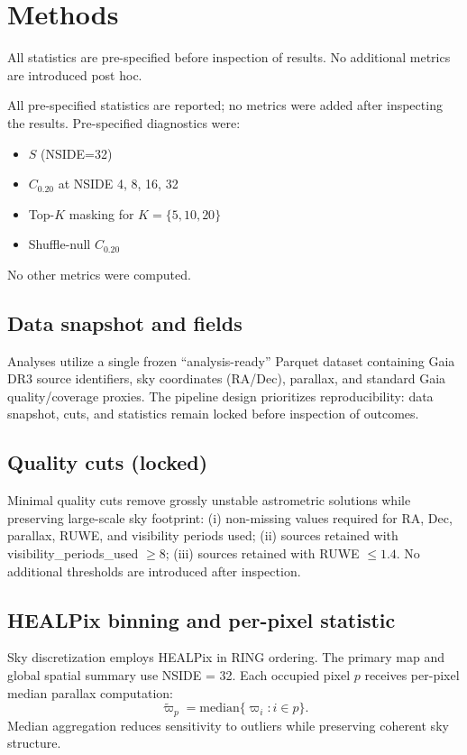 \section{Methods}

All statistics are pre-specified before inspection of results. No additional metrics are introduced post hoc.

All pre-specified statistics are reported; no metrics were added after inspecting the results.
Pre-specified diagnostics were:
\begin{itemize}
\item $S$ (NSIDE=32)
\item $C_{0.20}$ at NSIDE 4, 8, 16, 32
\item Top-$K$ masking for $K=\{5,10,20\}$
\item Shuffle-null $C_{0.20}$
\end{itemize}
No other metrics were computed.

\subsection{Data snapshot and fields}
Analyses utilize a single frozen ``analysis-ready'' Parquet dataset containing Gaia DR3 source identifiers, sky coordinates (RA/Dec), parallax, and standard Gaia quality/coverage proxies. The pipeline design prioritizes reproducibility: data snapshot, cuts, and statistics remain locked before inspection of outcomes.

\subsection{Quality cuts (locked)}
Minimal quality cuts remove grossly unstable astrometric solutions while preserving large-scale sky footprint: (i) non-missing values required for RA, Dec, parallax, RUWE, and visibility periods used; (ii) sources retained with visibility\_periods\_used $\ge 8$; (iii) sources retained with RUWE $\le 1.4$. No additional thresholds are introduced after inspection.

\subsection{HEALPix binning and per-pixel statistic}
Sky discretization employs HEALPix in RING ordering. The primary map and global spatial summary use NSIDE = 32. Each occupied pixel $p$ receives per-pixel median parallax computation:
\[
\tilde{\varpi}_{p} = \mathrm{median}\{\varpi_i : i \in p\}.
\]
Median aggregation reduces sensitivity to outliers while preserving coherent sky structure.


